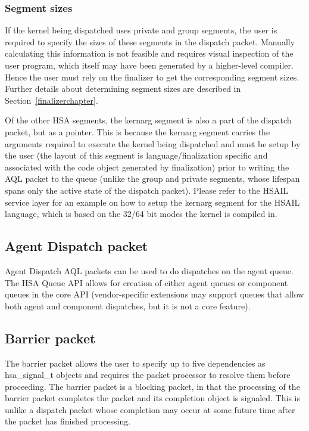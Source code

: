 \documentclass[draft]{book}
\newcommand{\mariotodo}[1]{\todo[color=CarnationPink]{#1}}
\newcommand{\reftyp}[1]{#1}
\begin{document}
\hypertarget{segment-sizes}{}\subsubsection{Segment sizes}
\label{segment-sizes}

If the kernel being dispatched uses private and group segments, the user is
required to specify the sizes of these segments in the dispatch
packet. Manually calculating this information is not feasible and requires
visual inspection of the user program, which itself may have been generated by a
higher-level compiler. Hence the user must rely on the finalizer to get the
corresponding segment sizes. Further details about determining segment sizes are
described in Section~\ref{finalizerchapter}.

Of the other HSA segments, the kernarg segment is also a part of the dispatch
packet, but as a pointer. This is because the kernarg segment carries the
arguments required to execute the kernel being dispatched and must be setup by
the user (the layout of this segment is language/finalization specific and
associated with the code object generated by finalization) prior to writing the
AQL packet to the queue (unlike the group and private segments, whose lifespan
spans only the active state of the dispatch packet). Please refer to the HSAIL
service layer \mariotodo{missing} for an example on how to setup the kernarg
segment for the HSAIL language, which is based on the 32/64 bit modes the kernel
is compiled in.

\hypertarget{agent-packet}{}\subsection{Agent Dispatch packet}
\label{agent-packet}

Agent Dispatch AQL packets can be used to do dispatches on the agent queue. The
HSA Queue API allows for creation of either agent queues or component queues in
the core API (vendor-specific extensions may support queues that allow both
agent and component dispatches, but it is not a core feature).

\hypertarget{barrier-packet}{}\subsection{Barrier packet}
\label{barrier-packet}

The barrier packet allows the user to specify up to five dependencies as
\reftyp{hsa_signal_t} objects and requires the packet processor to resolve them
before proceeding. The barrier packet is a blocking packet, in that the
processing of the barrier packet completes the packet and its completion object
is signaled. This is unlike a dispatch packet whose completion may occur at some
future time after the packet has finished processing.
\end{document}
